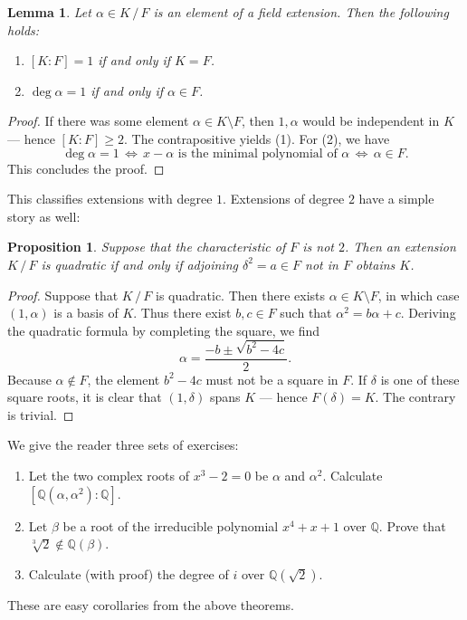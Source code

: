 \documentclass[11pt]{article}
\newtheorem{lemma}{Lemma}
\newtheorem{proposition}{Proposition}
\begin{document}
\begin{adjustwidth}{0.5cm}{}
  \begin{lemma}
    Let $\alpha \in K \, / \, F$ is an element of a field extension. Then the following holds:
    \begin{enumerate}
      \item $[K : F] = 1$ if and only if $K = F$.
      \item $\deg \alpha = 1$ if and only if $\alpha \in F$.
    \end{enumerate}
  \end{lemma}
  \begin{proof}
    If there was some element $\alpha \in K \setminus F$, then $1, \alpha$ would be independent in $K$ --- hence $[K : F] \ge 2$. The contrapositive yields (1). For (2), we have
    \[
      \deg \alpha = 1 \, \iff \, x - \alpha \text{ is the minimal polynomial of } \alpha \, \iff \, \alpha \in F.
    \]
    This concludes the proof.
  \end{proof}
\end{adjustwidth}

This classifies extensions with degree $1$. Extensions of degree $2$ have a simple story as well:

\begin{adjustwidth}{0.5cm}{}
  \begin{proposition}
    Suppose that the characteristic of $F$ is not $2$. Then an extension $K \, / \, F$ is quadratic if and only if adjoining $\delta^{2} = a \in F$ not in $F$ obtains $K$.
  \end{proposition}
  \begin{proof}
    Suppose that $K \, / \, F$ is quadratic. Then there exists $\alpha \in K \setminus F$, in which case $(1, \alpha)$ is a basis of $K$. Thus there exist $b, c \in F$ such that $\alpha^{2} = b \alpha + c$. Deriving the quadratic formula by completing the square, we find
    \[
      \alpha = \frac{-b \pm \sqrt{b^{2} - 4c}}{2}.
    \]
    Because $\alpha \notin F$, the element $b^{2} - 4c$ must not be a square in $F$. If $\delta$ is one of these square roots, it is clear that $(1, \delta)$ spans $K$ --- hence $F(\delta) = K$. The contrary is trivial.
  \end{proof}
\end{adjustwidth}
We give the reader three sets of exercises:
\begin{enumerate}
  \item Let the two complex roots of $x^{3} - 2 = 0$ be $\alpha$ and $\alpha^{2}$. Calculate $[\mathbb{Q}(\alpha, \alpha^{2}) : \mathbb{Q}]$.
  \item Let $\beta$ be a root of the irreducible polynomial $x^{4} + x + 1$ over $\mathbb{Q}$. Prove that $\sqrt[3]{2} \notin \mathbb{Q}(\beta)$.
  \item Calculate (with proof) the degree of $i$ over $\mathbb{Q}(\sqrt{2})$.
\end{enumerate}
These are easy corollaries from the above theorems.

\end{document}
